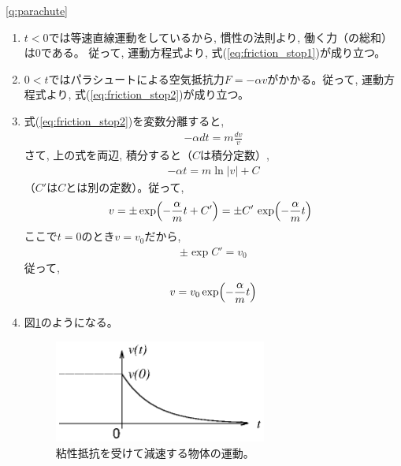 \ref{q:parachute}
\begin{enumerate}
\item $t<0$では等速直線運動をしているから, 慣性の法則より, 働く力（の総和）は0である。
従って, 運動方程式より, 式(\ref{eq:friction_stop1})が成り立つ。
\item $0<t$ではパラシュートによる空気抵抗力$F=-\alpha v$がかかる。従って, 運動方程式より, 式(\ref{eq:friction_stop2})が成り立つ。
\item 式(\ref{eq:friction_stop2})を変数分離すると, 
\begin{eqnarray}-\alpha dt=m\frac{dv}{v}\end{eqnarray}
さて, 上の式を両辺, 積分すると（$C$は積分定数）, 
\begin{eqnarray}-\alpha t=m\ln|v|+C\end{eqnarray}
（$C'$は$C$とは別の定数）。従って, 
\begin{eqnarray}v=\pm \exp\Bigl(-\frac{\alpha}{m}t+C'\Bigr)=\pm C'\,\exp\Bigl(-\frac{\alpha}{m}t\Bigr)\,\,\,\end{eqnarray}
ここで$t=0$のとき$v=v_0$だから, 
\begin{eqnarray}\pm \exp C'=v_0\end{eqnarray}
従って, 
\begin{eqnarray}v=v_0 \exp\Bigl(-\frac{\alpha}{m}t\Bigr)\end{eqnarray}
\item 図\ref{fig:viscos}のようになる。
\begin{figure}[h]
    \centering
    \includegraphics[width=7cm]{viscos.eps}
    \caption{粘性抵抗を受けて減速する物体の運動。}\label{fig:viscos}
\end{figure}
\end{enumerate}
\vspace{0.2cm}


